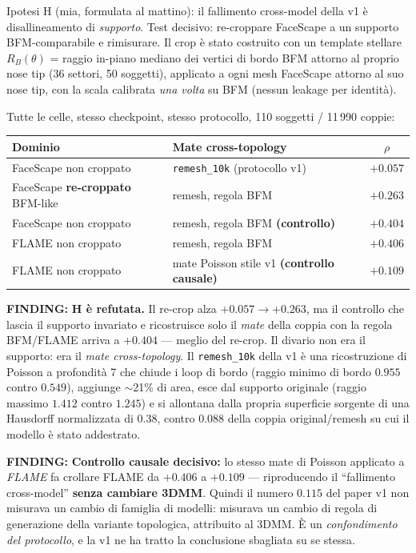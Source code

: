 \documentclass[11pt,a4paper]{article}
\newcommand{\finding}[1]{\textcolor{finding}{\textbf{FINDING:}} #1}
\begin{document}
Ipotesi H (mia, formulata al mattino): il fallimento cross-model della v1 \`e
disallineamento di \emph{supporto}. Test decisivo: re-croppare FaceScape a un supporto
BFM-comparabile e rimisurare. Il crop \`e stato costruito con un template stellare
$R_B(\theta)$ = raggio in-piano mediano dei vertici di bordo BFM attorno al proprio nose
tip (36 settori, 50 soggetti), applicato a ogni mesh FaceScape attorno al suo nose tip,
con la scala calibrata \emph{una volta} su BFM (nessun leakage per identit\`a).

Tutte le celle, stesso checkpoint, stesso protocollo, 110 soggetti / 11\,990 coppie:

\begin{center}
\begin{tabular}{llc}
\toprule
Dominio & Mate cross-topology & $\rho$ \\
\midrule
FaceScape non croppato & \texttt{remesh\_10k} (protocollo v1) & $+0.057$ \\
FaceScape \textbf{re-croppato} BFM-like & remesh, regola BFM & $+0.263$ \\
FaceScape non croppato & remesh, regola BFM \textbf{(controllo)} & $\mathbf{+0.404}$ \\
FLAME non croppato & remesh, regola BFM & $+0.406$ \\
FLAME non croppato & mate Poisson stile v1 \textbf{(controllo causale)} & $+0.109$ \\
\bottomrule
\end{tabular}
\end{center}

\finding{\textbf{H \`e refutata.} Il re-crop alza $+0.057 \to +0.263$, ma il controllo che
lascia il supporto invariato e ricostruisce solo il \emph{mate} della coppia con la regola
BFM/FLAME arriva a $+0.404$ --- meglio del re-crop. Il divario non era il supporto: era il
\emph{mate cross-topology}. Il \texttt{remesh\_10k} della v1 \`e una ricostruzione di
Poisson a profondit\`a 7 che chiude i loop di bordo (raggio minimo di bordo $0.955$ contro
$0.549$), aggiunge $\sim$21\% di area, esce dal supporto originale (raggio massimo $1.412$
contro $1.245$) e si allontana dalla propria superficie sorgente di una Hausdorff
normalizzata di $\mathbf{0.38}$, contro $\mathbf{0.088}$ della coppia
original/remesh su cui il modello \`e stato addestrato.}

\finding{\textbf{Controllo causale decisivo:} lo stesso mate di Poisson applicato a
\emph{FLAME} fa crollare FLAME da $+0.406$ a $+0.109$ --- riproducendo il ``fallimento
cross-model'' \textbf{senza cambiare 3DMM}. Quindi il numero $0.115$ del paper v1 non
misurava un cambio di famiglia di modelli: misurava un cambio di regola di generazione
della variante topologica, attribuito al 3DMM. \`E un \emph{confondimento del protocollo},
e la v1 ne ha tratto la conclusione sbagliata su se stessa.}
\end{document}
